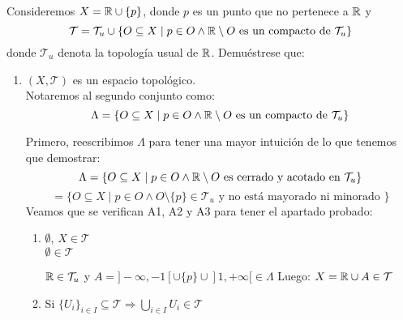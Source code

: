 \documentclass[12pt]{article}
\begin{document}
    \begin{ejercicio}[3 puntos]
        Consideremos $X = \mathbb{R} \cup \{p\}$, donde $p$ es un punto que no pertenece a $\mathbb{R}$ y 
        $$\mathcal{T} = \mathcal{T}_u \cup \{O \subseteq X \mid p \in O \land \mathbb{R}\setminus O \mbox{ es un compacto de } \mathcal{T}_u\}$$
        donde $\mathcal{T}_u$ denota la topología usual de $\mathbb{R}$. Demuéstrese que:
        \begin{enumerate}[label=(\alph*)]
            \item $(X,\mathcal{T})$ es un espacio topológico.\\

                \noindent
                Notaremos al segundo conjunto como:
                $$\Lambda = \{O \subseteq X \mid p \in O \land \mathbb{R}\setminus O \mbox{ es un compacto de } \mathcal{T}_u\} $$

                \noindent
                Primero, reescribimos $\Lambda$ para tener una mayor intuición de lo que tenemos que demostrar:
                $$\Lambda = \{O \subseteq X \mid p \in O \land \mathbb{R}\setminus O \mbox{ es cerrado y acotado en } \mathcal{T}_u\} $$
                $$ = \{ O \subseteq X \mid p \in O \land O \setminus \{p\} \in \mathcal{T}_u \mbox{ y no está mayorado ni minorado }\}$$
                Veamos que se verifican A1, A2 y A3 para tener el apartado probado:

                \begin{enumerate}
                    \item[A1)] $\emptyset$, $X \in \mathcal{T}$\\
                        
                        \noindent
                        $\emptyset \in \mathcal{T}$

                        \noindent
                        $\mathbb{R} \in \mathcal{T}_u$ y $A = ]-\infty, -1[ \cup \{p\} \cup ]1, +\infty[ \in \Lambda$\newline
                        Luego: $X = \mathbb{R} \cup A \in \mathcal{T}$
                    \item[A2)] Si $\{U_i\}_{i \in I} \subseteq \mathcal{T} \Rightarrow \displaystyle \bigcup_{i \in I} U_i \in \mathcal{T}$\\


\end{enumerate}
\end{enumerate}
\end{ejercicio}
\end{document}
